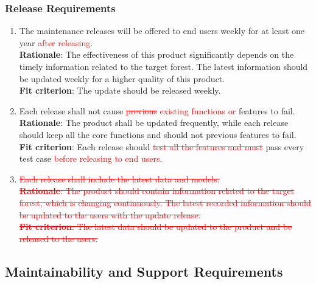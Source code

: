 \documentclass{article}
\begin{document}
\subsubsection{Release Requirements}
\begin{enumerate}[OE4.1]
    \item The maintenance releases will be offered to end users weekly for at least one year
   \textcolor{red}{after releasing}.\\
    \textbf{Rationale}: The effectiveness of this product significantly depends on the timely information related to the target forest. The latest information should be updated weekly for a higher quality of this product.\\
    \textbf{Fit criterion}: The update should be released weekly.\\
    \item Each release shall not cause \textcolor{red}{\st{previous} existing functions or} features 
    to fail. \\
    \textbf{Rationale}: The product shall be updated frequently, while each release should keep all the core functions and should not previous features to fail.\\
    \textbf{Fit criterion}: Each release should \textcolor{red}{\st{test all the features and must}}
     pass every test case \textcolor{red}{before releasing to end users}.\\
    
    \item \textcolor{red}{\st{Each release shall include the latest data and models. \\
    \textbf{Rationale}: The product should contain information related to the target forest, which is
     changing continuously. The latest recorded information should be updated to the users with the
      update release.\\
    \textbf{Fit criterion}: The latest data should be updated to the product and be released to the
     users. }}
\end{enumerate}
\subsection{Maintainability and Support Requirements}
\end{document}
